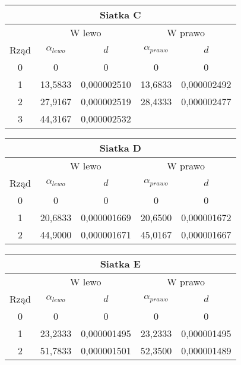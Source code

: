 \documentclass[10pt,a4paper]{article}
\begin{document}
\begin{center}
\begin{tabular}{|c|c|c|c|c|}
\hline
\multicolumn{5}{|c|}{Siatka C}\\
\hline
& \multicolumn{2}{c}{W lewo} & \multicolumn{2}{|c|}{W prawo}\\
\hline
Rząd & $\alpha_{lewo}$ & $d$ &$\alpha_{prawo}$&$d$\\
\hline
0&0&0&0&0\\ 
\hline
1 &13,5833 &0,000002510 & 13,6833 & 0,000002492\\ 
\hline 
2 &27,9167 &0,000002519 & 28,4333 & 0,000002477\\ 
\hline 
3 &44,3167 &0,000002532 & &\\ 
\hline 

 
\end{tabular}
\end{center}

\begin{center}
\begin{tabular}{|c|c|c|c|c|}
\hline
\multicolumn{5}{|c|}{Siatka D}\\
\hline
& \multicolumn{2}{c}{W lewo} & \multicolumn{2}{|c|}{W prawo}\\
\hline
Rząd & $\alpha_{lewo}$ & $d$ &$\alpha_{prawo}$&$d$\\
\hline
0&0&0&0&0\\ 
\hline
1&20,6833&0,000001669& 20,6500& 0,000001672\\ 
\hline 
2&44,9000&0,000001671& 45,0167& 0,000001667\\ 
\hline 
 
\end{tabular}
\end{center}

\begin{center}
\begin{tabular}{|c|c|c|c|c|}
\hline
\multicolumn{5}{|c|}{Siatka E}\\
\hline
& \multicolumn{2}{c}{W lewo} & \multicolumn{2}{|c|}{W prawo}\\
\hline
Rząd & $\alpha_{lewo}$ & $d$ &$\alpha_{prawo}$&$d$\\
\hline
0&0&0&0&0\\ 
\hline
1&23,2333&0,000001495& 23,2333& 0,000001495\\ 
\hline 
2&51,7833&0,000001501& 52,3500& 0,000001489\\ 
\hline 

\end{tabular}
\end{center}
\end{document}
